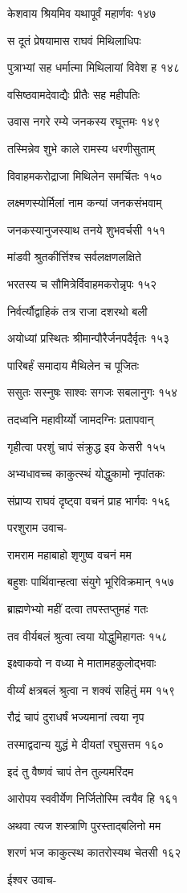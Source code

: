 केशवाय श्रियमिव यथापूर्वं महार्णवः १४७

स दूतं प्रेषयामास राघवं मिथिलाधिपः

पुत्राभ्यां सह धर्मात्मा मिथिलायां विवेश ह १४८

वसिष्ठवामदेवाद्यैः प्रीतैः सह महीपतिः

उवास नगरे रम्ये जनकस्य रघूत्तमः १४९

तस्मिन्नेव शुभे काले रामस्य धरणीसुताम्

विवाहमकरोद्राजा मिथिलेन समर्चितः १५०

लक्ष्मणस्योर्मिलां नाम कन्यां जनकसंभवाम्

जनकस्यानुजस्याथ तनये शुभवर्चसी १५१

मांडवी श्रुतकीर्त्तिश्च सर्वलक्षणलक्षिते

भरतस्य च सौमित्रेर्विवाहमकरोन्नृपः १५२

निर्वर्त्यौद्वाहिकं तत्र राजा दशरथो बली

अयोध्यां प्रस्थितः श्रीमान्पौरैर्जनपदैर्वृतः १५३

पारिबर्हं समादाय मैथिलेन च पूजितः

ससुतः सस्नुषः साश्वः सगजः सबलानुगः १५४

तदध्वनि महावीर्य्यो जामदग्निः प्रतापवान्

गृहीत्वा परशुं चापं संक्रुद्ध इव केसरी १५५

अभ्यधावच्च काकुत्स्थं योद्धुकामो नृपांतकः

संप्राप्य राघवं दृष्ट्वा वचनं प्राह भार्गवः १५६

परशुराम उवाच-

रामराम महाबाहो शृणुष्व वचनं मम

बहुशः पार्थिवान्हत्वा संयुगे भूरिविक्रमान् १५७

ब्राह्मणेभ्यो महीं दत्वा तपस्तप्तुमहं गतः

तव वीर्यबलं श्रुत्वा त्वया योद्धुमिहागतः १५८

इक्ष्वाकवो न वध्या मे मातामहकुलोद्भवाः

वीर्य्यं क्षत्रबलं श्रुत्वा न शक्यं सहितुं मम १५९

रौद्रं चापं दुराधर्षं भज्यमानां त्वया नृप

तस्माद्वदान्य युद्धं मे दीयतां रघुसत्तम १६०

इदं तु वैष्णवं चापं तेन तुल्यमरिंदम

आरोपय स्ववीर्येण निर्जितोस्मि त्वयैव हि १६१

अथवा त्यज शस्त्राणि पुरस्ताद्बलिनो मम

शरणं भज काकुत्स्थ कातरोस्यथ चेतसी १६२

ईश्वर उवाच-

